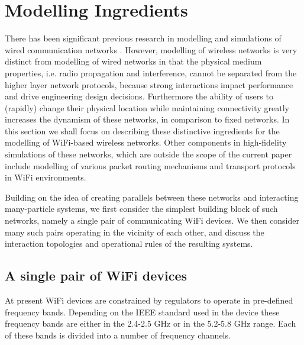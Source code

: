 \documentclass{elsart}
\begin{document}
\section{Modelling Ingredients}
\label{models}
There has been significant previous research in modelling \cite{internet} and 
simulations of wired communication networks \cite{ns2,riley}. 
However, modelling of wireless networks is very distinct from modelling of wired networks in that the physical medium 
properties, i.e. radio propagation and interference, cannot be separated from the higher layer 
network  protocols, because strong interactions impact performance and drive 
engineering design decisions. Furthermore the ability 
of users to (rapidly) change their physical location while maintaining 
connectivity greatly increases the dynamism of these networks, in comparison to fixed networks. In this section we shall focus on describing 
these distinctive ingredients for  the modelling of WiFi-based wireless networks. Other components in high-fidelity simulations of these networks, which are 
outside the scope of the current paper include modelling of 
various packet routing mechanisms \cite{wicom,routing} and  transport protocols
\cite{tcp} in WiFi environments.

Building on 
the idea of creating parallels between these networks and interacting
many-particle systems, we first consider 
the simplest building block of such networks, namely a single pair of
communicating  WiFi devices. We then consider many 
such pairs operating in the vicinity of each other, and  discuss the 
interaction topologies  and operational rules of the 
resulting systems.

\subsection{A single pair of WiFi devices}
At present WiFi  devices are constrained by regulators to operate in pre-defined
frequency bands. Depending on the IEEE standard used in the device these 
frequency bands are either in the 2.4-2.5 GHz or in the
5.2-5.8 GHz range. Each of these bands is divided into a 
number of frequency channels.  
\end{document}

